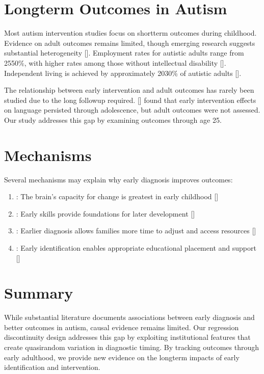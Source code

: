 \documentclass[letterpaper,10pt,english]{jupyterBook}
\begin{document}
\section{Long\sphinxhyphen{}term Outcomes in Autism}
\label{\detokenize{literature_review:long-term-outcomes-in-autism}}
\sphinxAtStartPar
Most autism intervention studies focus on short\sphinxhyphen{}term outcomes during childhood. Evidence on adult outcomes remains limited, though emerging research suggests substantial heterogeneity {[}{]}. Employment rates for autistic adults range from 25\sphinxhyphen{}50\%, with higher rates among those without intellectual disability {[}{]}. Independent living is achieved by approximately 20\sphinxhyphen{}30\% of autistic adults {[}{]}.

\sphinxAtStartPar
The relationship between early intervention and adult outcomes has rarely been studied due to the long follow\sphinxhyphen{}up required. {[}{]} found that early intervention effects on language persisted through adolescence, but adult outcomes were not assessed. Our study addresses this gap by examining outcomes through age 25.


\section{Mechanisms}
\label{\detokenize{literature_review:mechanisms}}
\sphinxAtStartPar
Several mechanisms may explain why early diagnosis improves outcomes:
\begin{enumerate}
%
\item {} 
\sphinxAtStartPar
{}: The brain’s capacity for change is greatest in early childhood {[}{]}

\item {} 
\sphinxAtStartPar
{}: Early skills provide foundations for later development {[}{]}

\item {} 
\sphinxAtStartPar
{}: Earlier diagnosis allows families more time to adjust and access resources {[}{]}

\item {} 
\sphinxAtStartPar
{}: Early identification enables appropriate educational placement and support {[}{]}

\end{enumerate}


\section{Summary}
\label{\detokenize{literature_review:summary}}
\sphinxAtStartPar
While substantial literature documents associations between early diagnosis and better outcomes in autism, causal evidence remains limited. Our regression discontinuity design addresses this gap by exploiting institutional features that create quasi\sphinxhyphen{}random variation in diagnostic timing. By tracking outcomes through early adulthood, we provide new evidence on the long\sphinxhyphen{}term impacts of early identification and intervention.
\end{document}
